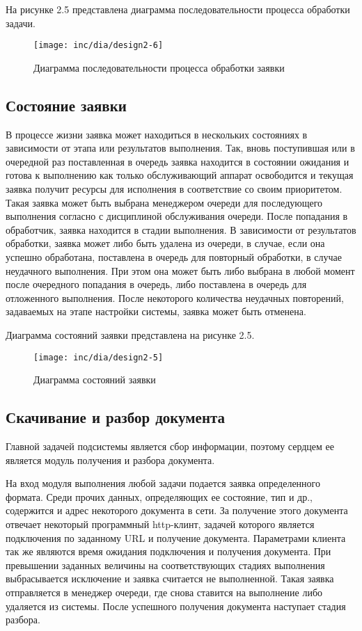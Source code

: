 На рисунке 2.5 представлена диаграмма последовательности процесса обработки задачи.

\begin{figure}
  \centering
  \texttt{[image: inc/dia/design2-6]}
  \caption{Диаграмма последовательности процесса обработки заявки}
  \label{fig:fig06}
\end{figure}

\subsection{Состояние заявки}
В процессе жизни заявка может находиться в нескольких состояниях в зависимости от этапа или результатов выполнения. Так, вновь поступившая или в очередной раз поставленная в очередь заявка находится в состоянии ожидания и готова к выполнению как только обслуживающий аппарат освободится и текущая заявка получит ресурсы для исполнения в соответствие со своим приоритетом. Такая заявка может быть выбрана менеджером очереди для последующего выполнения согласно с дисциплиной обслуживания очереди. После попадания в обработчик, заявка находится в стадии выполнения. В зависимости от результатов обработки, заявка может либо быть удалена из очереди, в случае, если она успешно обработана, поставлена в очередь для повторный обработки, в случае неудачного выполнения. При этом она может быть либо выбрана в любой момент после очередного попадания в очередь, либо поставлена в очередь для отложенного выполнения. После некоторого количества неудачных повторений, задаваемых на этапе настройки системы, заявка может быть отменена.

Диаграмма состояний заявки представлена на рисунке 2.5.

\begin{figure}
  \centering
  \texttt{[image: inc/dia/design2-5]}
  \caption{Диаграмма состояний заявки}
  \label{fig:fig05}
\end{figure}

\subsection{Скачивание и разбор документа}

Главной задачей подсистемы является сбор информации, поэтому сердцем ее является модуль получения и разбора документа. 

На вход модуля выполнения любой задачи подается заявка определенного формата. Среди прочих данных, определяющих ее состояние, тип и др., содержится и адрес некоторого документа в сети. За получение этого документа отвечает некоторый программный http-клинт, задачей которого является подключения по заданному URL и получение документа. Параметрами клиента так же являются время ожидания подключения и получения документа. При превышении заданных величины на соответствующих стадиях выполнения выбрасывается исключение и заявка считается не выполненной. Такая заявка отправляется в менеджер очереди, где снова ставится на выполнение либо удаляется из системы. После успешного получения документа наступает стадия разбора.

